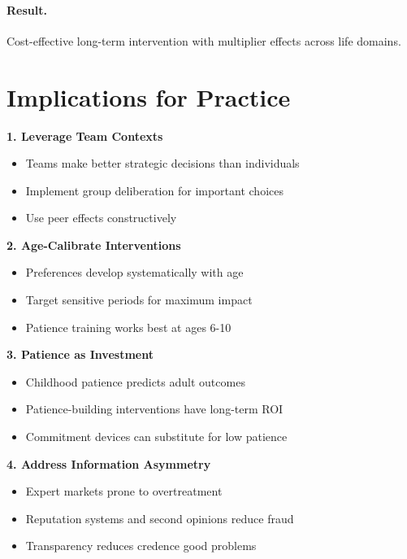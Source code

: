 \paragraph{Result.} Cost-effective long-term intervention with multiplier effects
across life domains.


\section{Implications for Practice}
\label{sec:sut-practice}

\begin{tcolorbox}[colback=green!5!white, colframe=green!75!black,
    title=Practical Implications from Sutter's Research]

\textbf{1. Leverage Team Contexts}
\begin{itemize}[nosep]
    \item Teams make better strategic decisions than individuals
    \item Implement group deliberation for important choices
    \item Use peer effects constructively
\end{itemize}

\textbf{2. Age-Calibrate Interventions}
\begin{itemize}[nosep]
    \item Preferences develop systematically with age
    \item Target sensitive periods for maximum impact
    \item Patience training works best at ages 6-10
\end{itemize}

\textbf{3. Patience as Investment}
\begin{itemize}[nosep]
    \item Childhood patience predicts adult outcomes
    \item Patience-building interventions have long-term ROI
    \item Commitment devices can substitute for low patience
\end{itemize}

\textbf{4. Address Information Asymmetry}
\begin{itemize}[nosep]
    \item Expert markets prone to overtreatment
    \item Reputation systems and second opinions reduce fraud
    \item Transparency reduces credence good problems
\end{itemize}

\end{tcolorbox}


